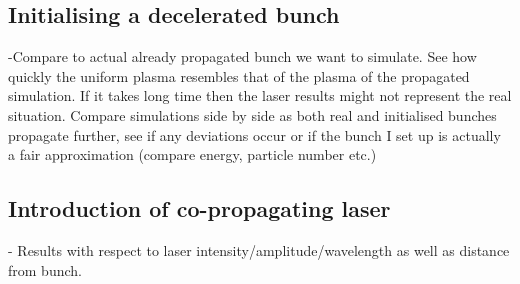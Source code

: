 \subsection{Initialising a decelerated bunch}
-Compare to actual already propagated bunch we want to simulate. See how quickly the uniform plasma resembles that of the plasma of the propagated simulation. If it takes long time then the laser results might not represent the real situation.  Compare simulations side by side as both real and initialised bunches propagate further, see if any deviations occur or if the bunch I set up is actually a fair approximation (compare energy, particle number etc.)
\subsection{Introduction of co-propagating laser}
- Results with respect to laser intensity/amplitude/wavelength as well as distance from bunch.


